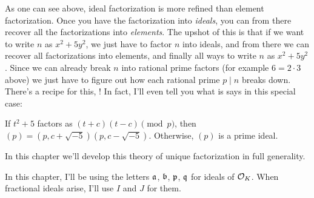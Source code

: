 As one can see above,
ideal factorization is more refined than element factorization.
Once you have the factorization into \emph{ideals},
you can from there recover all the factorizations into \emph{elements}.
The upshot of this is that if we want to write $n$ as $x^2+5y^2$,
we just have to factor $n$ into ideals,
and from there we can recover all factorizations into elements,
and finally all ways to write $n$ as $x^2+5y^2$.
Since we can already break $n$ into rational prime factors
(for example $6 = 2 \cdot 3$ above)
we just have to figure out how each rational prime $p \mid n$ breaks down.
There's a recipe for this, !
In fact, I'll even tell you what is says in this special case:
\begin{itemize}
	\ii If $t^2+5$ factors as $(t+c)(t-c) \pmod p$,
	then $(p) = (p, c+\sqrt{-5})(p, c-\sqrt{-5})$.
	\ii Otherwise, $(p)$ is a prime ideal.
\end{itemize}
In this chapter we'll develop this theory of unique factorization in full generality.


\begin{remark}
	In this chapter, I'll be using the letters $\aa$, $\bb$, $\pp$, $\qq$
	for ideals of $\OO_K$.
	When fractional ideals arise, I'll use $I$ and $J$ for them.
\end{remark}

